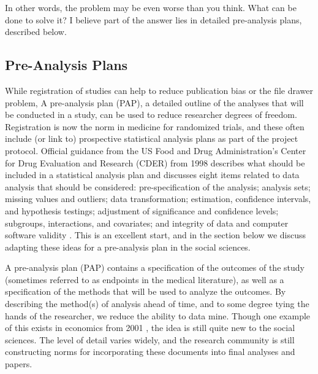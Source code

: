 \documentclass[12pt] {article}
\begin{document}
In other words, the problem may be even worse than you think. What can be
done to solve it? I believe part of the answer lies in detailed
pre-analysis plans, described below.

\subsection{Pre-Analysis
Plans}\label{pre-analysis-plans}

While registration of studies can help to reduce publication bias or the file drawer problem, 
A pre-analysis plan (PAP), a detailed outline of the analyses that will be conducted in a study, can be used to reduce researcher degrees of freedom. Registration is now the norm in medicine for randomized trials, and these often include (or link to) prospective statistical analysis plans as part of the project protocol. Official guidance from the US Food and Drug Administration's Center for Drug Evaluation and Research (CDER) from 1998 describes what should be included in a statistical analysis plan and discusses eight items related to data analysis that should be considered: pre-specification of the analysis; analysis sets; missing values and outliers; data transformation; estimation, confidence intervals, and hypothesis testings; adjustment of significance and confidence levels; subgroups, interactions, and covariates; and integrity of data and computer software validity \citep{food1998guidance}.   %
This is an excellent start, and in the section below we discuss adapting these ideas for a pre-analysis plan in the social sciences.

A pre-analysis plan (PAP) contains a specification of the outcomes of the study (sometimes referred to as endpoints in the medical literature), as well as a specification of the methods that will be used to analyze the outcomes. By describing the
method(s) of analysis ahead of time, and to some degree tying the hands
of the researcher, we reduce the ability to data mine. Though one
example of this exists in economics from 2001 \citep{neumark_employment_2001}, the idea
is still quite new to the social sciences. The level of detail varies
widely, and the research community is still constructing norms for
incorporating these documents into final analyses and papers.
\end{document}
